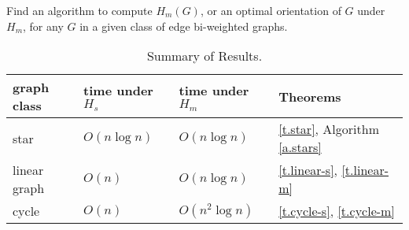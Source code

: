 \begin{problem}
Find an algorithm to compute
$H_m(G) $, or an optimal orientation of $G$ under $H_m$,
for any $G$ in a given class of edge bi-weighted graphs.
\end{problem}

\begin{table*}[h!]
	\begin{center}
		\caption{Summary of Results.}
		\label{tbl:summary}
		\begin{tabular}{|l|l|l|l|}
			\hline
			graph class & time under $H_s$ & time under $H_m$  & Theorems  \\
			\hline
			star            &        $O(n \log n)$  & $O(n \log n)$        & \ref{t.star}, Algorithm \ref{a.stars}	\\
						\hline
			linear graph & $O(n)$        		&$O(n \log n)$ 	& \ref{t.linear-s}, \ref{t.linear-m} \\
						\hline
			cycle 		 & $O(n)$ 		& $O(n^2 \log n)$ 		&  \ref{t.cycle-s}, \ref{t.cycle-m} \\

			\hline
		\end{tabular}
	\end{center}
\end{table*}
